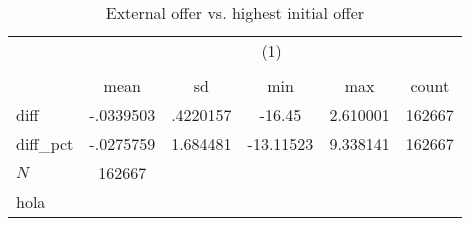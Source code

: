 \begin{table}[htbp]\centering
\def\sym#1{\ifmmode^{#1}\else\(^{#1}\)\fi}
\caption{External offer vs. highest initial offer}
\begin{tabular}{l*{1}{ccccc}}
\hline\hline
            &\multicolumn{5}{c}{(1)}                                         \\
            &\multicolumn{5}{c}{}                                            \\
            &        mean&          sd&         min&         max&       count\\
\hline
diff        &   -.0339503&    .4220157&      -16.45&    2.610001&      162667\\
diff\_pct    &   -.0275759&    1.684481&   -13.11523&    9.338141&      162667\\
\hline
\(N\)       &      162667&            &            &            &            \\
\hline\hline
\multicolumn{6}{l}{\footnotesize hola}\\
\end{tabular}
\end{table}
